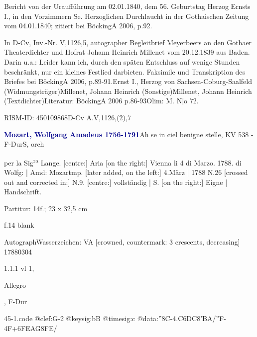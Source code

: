 \documentclass[a4paper, twocolumn, 11pt]{book}
\begin{document}
\newline %
\par Bericht von der Uraufführung am 02.01.1840, dem 56. Geburtstag Herzog Ernsts I., in den {\textquotedbl}Vorzimmern Se. Herzoglichen Durchlaucht{\textquotedbl} in der Gothaischen Zeitung vom 04.01.1840; zitiert bei BöckingA 2006, p.92.
\par In D-Cv, Inv.-Nr. V,1126,5, autographer Begleitbrief Meyerbeers an den Gothaer Theaterdichter und Hofrat Johann Heinrich Millenet vom 20.12.1839 aus Baden. Darin u.a.: {\textquotedbl}Leider kann ich, durch den späten Entschluss auf wenige Stunden beschränkt, nur ein kleines Festlied darbieten.{\textquotedbl} Faksimile und Transkription des Briefes bei BöckingA 2006, p.89-91.\newline Ernst I., Herzog von Sachsen-Coburg-Saalfeld  (Widmungsträger)\newline Millenet, Johann Heinrich  (Sonstige)\newline Millenet, Johann Heinrich  (Textdichter)\newline Literatur: BöckingA 2006  p.86-93\newline Olim: M. N|o 72.
\par RISM-ID: 450109868\newline D-Cv  A.V,1126,(2),7
\par \vspace{16pt} \textcolor{darkblue}{\textbf{Mozart, Wolfgang Amadeus  1756-1791}}\hfillplus{[45]}\newline Ah se in ciel benigne stelle, KV 538 - F-Dur\newline S, orch
\par \begin{itshape} per la Sig\textsuperscript{r}\textsuperscript{a} Lange. [centre:] Aria [on the right:] Vienna li 4 di Marzo. 1788. di Wolfg: | Amd: Mozartmp. [later added, on the left:] 4.März | 1788 N.26 [crossed out and corrected in:] N.9. [centre:] vollständig | S. [on the right:]  Eigne | Handschrift.\end{itshape} 
\par \textcolor{darkblue}{}  Partitur: 14f.; 23 x 32,5 cm\newline \begin{small} f.14 blank\end{small} \newline Autograph\newline Wasserzeichen: VA [crowned, countermark: 3 crescents, decreasing]  17880304
\par 1.1.1  vl 1, \begin{itshape}Allegro\end{itshape}, F-Dur  
\begin{filecontents*}{45-1.code}
@clef:G-2
@keysig:bB
@timesig:c
@data:''8C-4.C{6DC}{8'BA}/''F-4F+{6FEAG}{8FE}/
\end{filecontents*}
\end{document}
